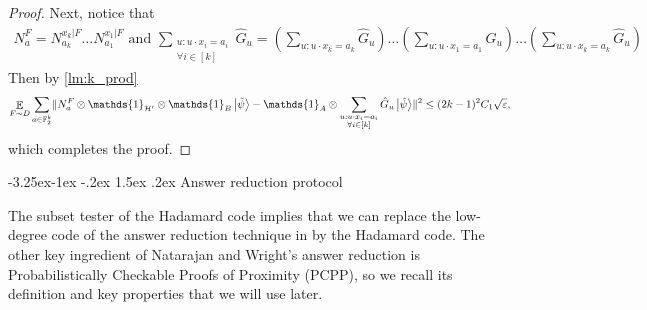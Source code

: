 \documentclass[10pt,a4paper]{article}
\makeatletter
\renewcommand{\subsection}{\@startsection{subsection}{2}{\z@}%
             {-3.25ex\@plus -1ex \@minus -.2ex}%
             {1.5ex \@plus .2ex}%
             {\normalfont\large\scshape\bfseries}}
\theoremstyle{plain}
\theoremstyle{definition}
\DeclarePairedDelimiter{\norm}{\lVert}{\rVert}
\newcommand {\ket} [1] {\ensuremath{ \left| #1 \right\rangle }}
\DeclareMathOperator*{\bigE}{\mathbb{E}}
\newcommand {\id} {\ensuremath{\mathds{1}}}
\newcommand{\ep} {\ensuremath{\varepsilon}}
\newcommand{\x}{\otimes}
\newcommand{\calH}{\mathcal{H}}
\newcommand{\1}{\mathbb{1}} %
\newcommand{\bF}{\mathbb{F}}
\newcommand{\tpsi}{\tilde{\psi}}
\makeatother
\begin{document}
\begin{proof}
	 
Next, notice that 
\begin{align*}
	N^F_a = N^{x_k | F }_{a_k} \ldots N^{x_1 | F}_{a_1} \text{ and }  
	 \sum_{\substack{u: u\cdot x_i = a_i\\\forall i \in [k]}} \hat{G}_u = 
	 \left( \sum_{u: u\cdot x_k = a_k}\hat{G}_u \right)\ldots \left( \sum_{u: u\cdot x_1 = a_1}\hat{G}_u \right) \ldots \left( \sum_{u: u\cdot x_k = a_k}\hat{G}_u \right)
\end{align*}
Then by \cref{lm:k_prod}
\begin{align*}
	\bigE_{F \sim D} \sum_{a \in \bF_2^k} \norm{ N^F_a \x \id_{\calH'} \x \id_B \ket{\tpsi} - \id_A \x \sum_{\substack{u: u\cdot x_i = a_i\\\forall i \in [k]}} \hat{G}_u \ket{\tpsi}}^2 \leq  (2k-1)^2 C_1 \sqrt{\ep},
\end{align*}
which completes the proof.
\end{proof}

\subsection{Answer reduction protocol}

The subset tester of the Hadamard code implies that we can replace the low-degree code of the answer reduction technique
in \cite[Section 17.4]{neexp} by the Hadamard code. 
The other key ingredient of Natarajan and Wright's answer reduction is Probabilistically Checkable Proofs of Proximity (PCPP),
so we recall its definition and key properties that we will use later.
\end{document}
